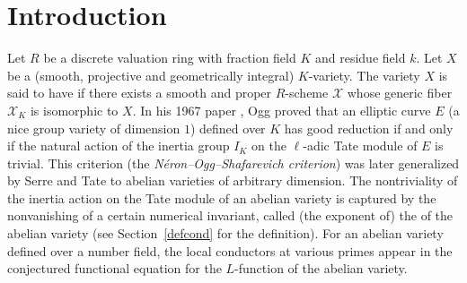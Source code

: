 \chapter{Introduction}
Let $R$ be a discrete valuation ring with fraction field $K$ and residue field $k$. Let $X$ be a {} (smooth, projective and geometrically integral) $K$-variety. The variety $X$ is said to have {} if there exists a smooth and proper $R$-scheme $\mathscr{X}$ whose generic fiber $\mathscr{X}_K$ is isomorphic to $X$. In his 1967 paper \cite{ogg}, Ogg proved that an elliptic curve $E$ (a nice group variety of dimension $1$) defined over $K$ has good reduction if and only if the natural action of the inertia group $I_K$ on the $\ell$-adic Tate module of $E$ is trivial. This criterion (the {\textit{N\'{e}ron--Ogg--Shafarevich criterion}}) was later generalized by Serre and Tate \cite{serretate} to abelian varieties of arbitrary dimension. The nontriviality of the inertia action on the Tate module of an abelian variety is captured by the nonvanishing of a certain numerical invariant, called (the exponent of) the {} of the abelian variety (see Section~\ref{defcond} for the definition). For an abelian variety defined over a number field, the local conductors at various primes appear in the conjectured functional equation for the $L$-function of the abelian variety.

